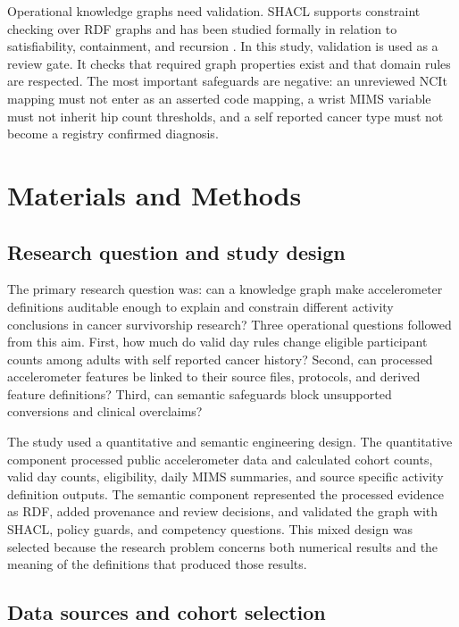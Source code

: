 \documentclass[final,5p,times,twocolumn]{elsarticle}
\begin{document}
Operational knowledge graphs need validation. SHACL supports constraint checking over RDF graphs and has been studied formally in relation to satisfiability, containment, and recursion \cite{pareti2022recursive}. In this study, validation is used as a review gate. It checks that required graph properties exist and that domain rules are respected. The most important safeguards are negative: an unreviewed NCIt mapping must not enter as an asserted code mapping, a wrist MIMS variable must not inherit hip count thresholds, and a self reported cancer type must not become a registry confirmed diagnosis.

\section{Materials and Methods}
\label{sec:methods}

\subsection{Research question and study design}

The primary research question was: can a knowledge graph make accelerometer definitions auditable enough to explain and constrain different activity conclusions in cancer survivorship research? Three operational questions followed from this aim. First, how much do valid day rules change eligible participant counts among adults with self reported cancer history? Second, can processed accelerometer features be linked to their source files, protocols, and derived feature definitions? Third, can semantic safeguards block unsupported conversions and clinical overclaims?

The study used a quantitative and semantic engineering design. The quantitative component processed public accelerometer data and calculated cohort counts, valid day counts, eligibility, daily MIMS summaries, and source specific activity definition outputs. The semantic component represented the processed evidence as RDF, added provenance and review decisions, and validated the graph with SHACL, policy guards, and competency questions. This mixed design was selected because the research problem concerns both numerical results and the meaning of the definitions that produced those results.

\subsection{Data sources and cohort selection}
\end{document}
